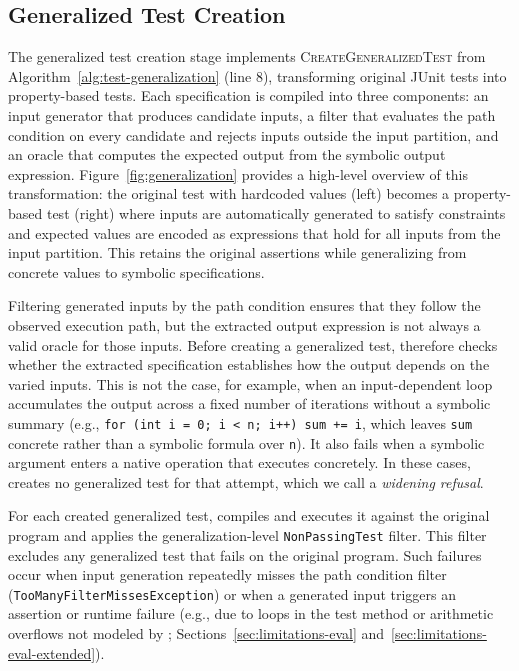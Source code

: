 \subsection{Generalized Test Creation}
\label{sec:generalized-test-creation}

The generalized test creation stage implements \textsc{CreateGeneralizedTest}
from Algorithm~\ref{alg:test-generalization} (line 8),
transforming original JUnit tests
into property-based \ToolJqwik{} tests.
Each specification is compiled into three components:
an input generator that produces candidate inputs,
a filter that evaluates the path condition on every candidate
and rejects inputs outside the input partition,
and an oracle that computes the expected output from the symbolic output expression.
Figure~\ref{fig:generalization} provides a high-level overview of this transformation:
the original test with hardcoded values (left) becomes a property-based test (right)
where inputs are automatically generated to satisfy constraints
and expected values are encoded as expressions that hold for all inputs from the input partition.
This retains the original assertions
while generalizing from concrete values to symbolic specifications.

Filtering generated inputs by the path condition ensures that they follow the observed execution path,
but the extracted output expression is not always a valid oracle for those inputs.
Before creating a generalized test, \ToolTeralizer{} therefore checks whether the extracted specification establishes how the output depends on the varied inputs.
This is not the case, for example, when an input-dependent loop accumulates the output across a fixed number of iterations without a symbolic summary (e.g., \texttt{for (int i = 0; i < n; i++) sum += i}, which leaves \texttt{sum} concrete rather than a symbolic formula over \texttt{n}).
It also fails when a symbolic argument enters a native operation that \ToolSPF{} executes concretely.
In these cases, \ToolTeralizer{} creates no generalized test for that attempt, which we call a \emph{widening refusal}.

For each created generalized test, \ToolTeralizer{} compiles and executes it against the original program and applies the generalization-level \texttt{NonPassingTest} filter.
This filter excludes any generalized test that fails on the original program.
Such failures occur when input generation repeatedly misses the path condition filter (\texttt{Too\-Many\-Filter\-Misses\-Exception}) or when a generated input triggers an assertion or runtime failure (e.g., due to loops in the test method or arithmetic overflows not modeled by \ToolSPF{}; Sections~\ref{sec:limitations-eval} and~\ref{sec:limitations-eval-extended}).

